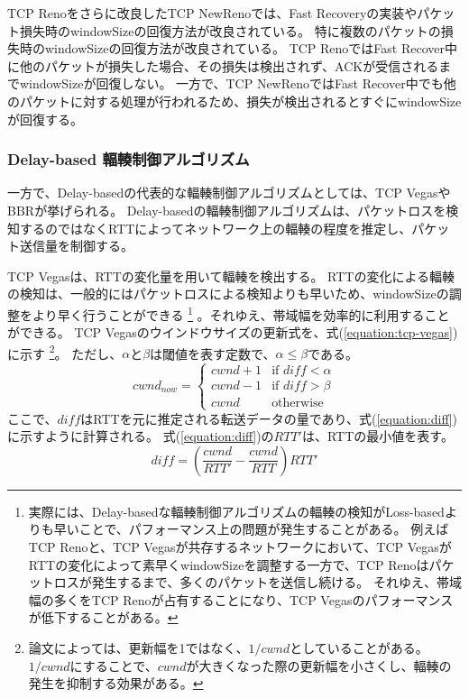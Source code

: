\documentclass[a4paper,11pt]{jreport}
\newcommand{\equationref}[1]{式(\ref{#1})}
\begin{document}
TCP Renoをさらに改良したTCP NewReno\cite{floyd2004newreno,henderson2012newreno}では、Fast Recoveryの実装やパケット損失時のwindowSizeの回復方法が改良されている。
特に複数のパケットの損失時のwindowSizeの回復方法が改良されている。
TCP RenoではFast Recover中に他のパケットが損失した場合、その損失は検出されず、ACKが受信されるまでwindowSizeが回復しない。
一方で、TCP NewRenoではFast Recover中でも他のパケットに対する処理が行われるため、損失が検出されるとすぐにwindowSizeが回復する。

\subsubsection*{Delay-based 輻輳制御アルゴリズム}

一方で、Delay-basedの代表的な輻輳制御アルゴリズムとしては、TCP Vegas\cite{tcp-vegas}やBBR\cite{bbr}が挙げられる。
Delay-basedの輻輳制御アルゴリズムは、パケットロスを検知するのではなくRTTによってネットワーク上の輻輳の程度を推定し、パケット送信量を制御する。

TCP Vegasは、RTTの変化量を用いて輻輳を検出する。
RTTの変化による輻輳の検知は、一般的にはパケットロスによる検知よりも早いため、windowSizeの調整をより早く行うことができる
\footnote{実際には、Delay-basedな輻輳制御アルゴリズムの輻輳の検知がLoss-basedよりも早いことで、パフォーマンス上の問題が発生することがある。
例えばTCP Renoと、TCP Vegasが共存するネットワークにおいて、TCP VegasがRTTの変化によって素早くwindowSizeを調整する一方で、TCP Renoはパケットロスが発生するまで、多くのパケットを送信し続ける。
それゆえ、帯域幅の多くをTCP Renoが占有することになり、TCP Vegasのパフォーマンスが低下することがある。
}
。それゆえ、帯域幅を効率的に利用することができる。
TCP Vegasのウインドウサイズの更新式を、\equationref{equation:tcp-vegas}に示す
\footnote{論文によっては、更新幅を1ではなく、$1/cwnd$としていることがある。
$1/cwnd$にすることで、$cwnd$が大きくなった際の更新幅を小さくし、輻輳の発生を抑制する効果がある。}。
ただし、$\alpha$と$\beta$は閾値を表す定数で、$\alpha \leq \beta$である。
\begin{equation}
  \label{equation:tcp-vegas}
  cwnd_{now} =
  \begin{cases}
    cwnd + 1 & \text{if } diff < \alpha \\
    cwnd - 1 & \text{if } diff > \beta \\
    cwnd & \text{otherwise}
  \end{cases}
\end{equation}
ここで、$diff$はRTTを元に推定される転送データの量であり、\equationref{equation:diff}に示すように計算される。
\equationref{equation:diff}の$RTT'$は、RTTの最小値を表す。
\begin{equation}
  \label{equation:diff}
  diff = \left( \frac{cwnd}{RTT'} - \frac{cwnd}{RTT}\right) RTT'
\end{equation}
\end{document}
